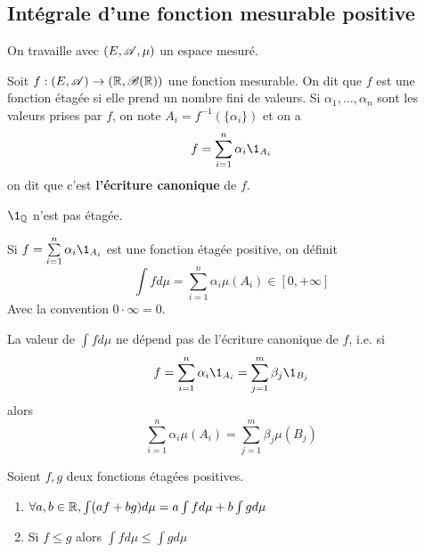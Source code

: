 \subsection{Intégrale d'une fonction mesurable positive}


On travaille avec $(E,\mathscr{A},\mu)$ un espace mesuré.

\begin{definition}
	Soit $f: (E, \mathscr{A}) \to (\mathbb{R}, \mathscr{B}(\mathbb{R}))$ une fonction mesurable. On dit que $f$ est une fonction étagée
	si elle prend un nombre fini de valeurs.
	Si $\alpha_1, \dots, \alpha_n$ sont les valeurs prises par $f$, on note
	$A_i = f^{-1}(\{\alpha_i\})$ et on a
	$$ f = \sum_{i=1}^n \alpha_i \1_{A_i} $$
	on dit que c'est \textbf{l'écriture canonique} de $f$.
\end{definition}

\begin{remarque}
	$\1_{\Q}$ n'est pas étagée.
\end{remarque}


\begin{definition}
	Si $f = \sum\limits_{i=1}^n \alpha_i \1_{A_i}$ est une fonction étagée positive, on définit
	$$ \int f d\mu = \sum_{i=1}^n \alpha_i \mu(A_i) \in [0, +\infty] $$
	Avec la convention $0 \cdot \infty = 0$.
\end{definition}


\begin{remarque}
	La valeur de $\int f d\mu$ ne dépend pas de l'écriture canonique de $f$, i.e. si
	$$ f = \sum_{i=1}^n \alpha_i \1_{A_i} = \sum_{j=1}^m \beta_j \1_{B_j} $$
	alors
	$$ \sum_{i=1}^n \alpha_i \mu(A_i) = \sum_{j=1}^m \beta_j \mu(B_j) $$
\end{remarque} %

\begin{prop}
	Soient $f,g$ deux fonctions étagées positives.
	\begin{enumerate}
		\item $  \forall a, b \in \mathbb{R}, \int (af + bg) d\mu = a \int f d\mu + b \int g d\mu$
		\item Si $f \leq g$ alors $\int f d\mu \leq \int g d\mu$
	\end{enumerate}
\end{prop}

